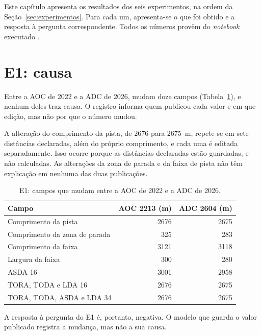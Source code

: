 Este capítulo apresenta os resultados dos seis experimentos, na ordem da Seção~\ref{sec:experimentos}. Para cada um, apresenta-se o que foi obtido e a resposta à pergunta correspondente. Todos os números provêm do \textit{notebook} executado \cite{aeroledger_experimentos}.

\section{E1: causa}\label{sec:res-e1}

Entre a AOC de 2022 e a ADC de 2026, mudam doze campos (Tabela~\ref{tab:res-e1}), e nenhum deles traz causa. O registro informa quem publicou cada valor e em que edição, mas não por que o número mudou.

A alteração do comprimento da pista, de 2676 para 2675~m, repete-se em sete distâncias declaradas, além do próprio comprimento, e cada uma é editada separadamente. Isso ocorre porque as distâncias declaradas estão guardadas, e não calculadas. As alterações da zona de parada e da faixa de pista não têm explicação em nenhuma das duas publicações.

\begin{table}[htbp]
    \centering
    \caption{E1: campos que mudam entre a AOC de 2022 e a ADC de 2026.}
    \label{tab:res-e1}
    \begin{tabular}{l r r}
        \toprule
        Campo & AOC 2213 (m) & ADC 2604 (m) \\
        \midrule
        Comprimento da pista & 2676 & 2675 \\
        Comprimento da zona de parada & 325 & 283 \\
        Comprimento da faixa & 3121 & 3118 \\
        Largura da faixa & 300 & 280 \\
        ASDA 16 & 3001 & 2958 \\
        TORA, TODA e LDA 16 & 2676 & 2675 \\
        TORA, TODA, ASDA e LDA 34 & 2676 & 2675 \\
        \bottomrule
    \end{tabular}
    \par{}
\end{table}

A resposta à pergunta do E1 é, portanto, negativa. O modelo que guarda o valor publicado registra a mudança, mas não a sua causa.

